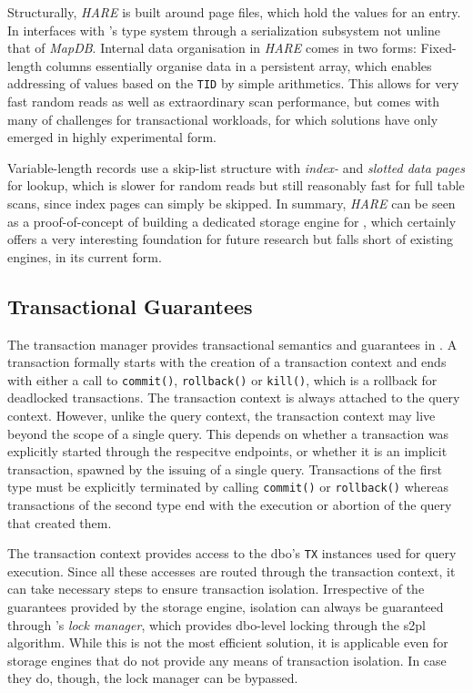 Structurally, \emph{HARE} is built around page files, which hold the values for an entry. In interfaces with \cottontail{}'s type system through a serialization subsystem not unline that of \emph{MapDB}. Internal data organisation in \emph{HARE} comes in two forms: Fixed-length columns essentially organise data in a persistent array, which enables addressing of values based on the \texttt{TID} by simple arithmetics. This allows for very fast random reads as well as extraordinary scan performance, but comes with many of challenges for transactional workloads, for which solutions have only emerged in highly experimental form.

Variable-length records use a skip-list structure with \emph{index-} and \emph{slotted data pages} for lookup, which is slower for random reads but still reasonably fast for full table scans, since index pages can simply be skipped. In summary, \emph{HARE} can be seen as a proof-of-concept of building a dedicated storage engine for \cottontail, which certainly offers a very interesting foundation for future research but falls short of existing engines, in its current form.

\subsection{Transactional Guarantees}

The transaction manager provides transactional semantics and guarantees in \cottontail. A transaction formally starts with the creation of a transaction context and ends with either a call to \texttt{commit()}, \texttt{rollback()} or  \texttt{kill()}, which is a rollback for deadlocked transactions. The transaction context is always attached to the query context. However, unlike the query context, the transaction context may live beyond the scope of a single query. This depends on whether a transaction was explicitly started through the respecitve endpoints, or whether it is an implicit transaction, spawned by the issuing of a single query. Transactions of the first type must be explicitly terminated by calling  \texttt{commit()} or \texttt{rollback()} whereas transactions of the second type end with the execution or abortion of the query that created them.

The transaction context provides access to the \acrshort{dbo}'s \texttt{TX} instances used for query execution. Since all these accesses are routed through the transaction context, it can take necessary steps to ensure transaction isolation. Irrespective of the guarantees provided by the storage engine, isolation can always be guaranteed through \cottontail{}'s \emph{lock manager}, which provides \acrshort{dbo}-level locking through the \acrshort{s2pl} algorithm. While this is not the most efficient solution, it is applicable even for storage engines that do not provide any means of transaction isolation. In case they do, though, the lock manager can be bypassed.

